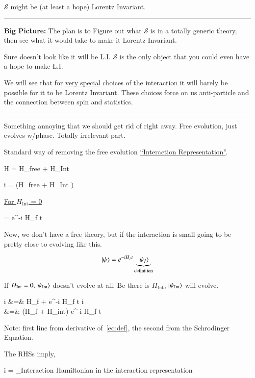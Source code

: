 {$\mathcal{S}$ might be (at least a hope) Lorentz Invariant.


\noindent\rule{\textwidth}{1pt}

\textbf{Big Picture:}
The plan is to Figure out what $\mathcal{S}$ is in a totally generic theory, then see what it would take to make it Lorentz Invariant. 

Sure doesn't look like it will be L.I. 
$\mathcal{S}$ is the only object that you could even have a hope to make L.I.

We will see that for \underline{very special} choices of the interaction it will barely be possible for it to be Lorentz Invariant. 
These choices force on us anti-particle and the connection between spin and statistics. 

\noindent\rule{\textwidth}{1pt}

Something annoying that we should get rid of right away. 
Free evolution, just evolves w/phase. Totally irrelevant part.


Standard way of removing the free evolution \underline{``Interaction Representation''}.

\be
H = H_\textrm{free} + H_\textrm{Int}
\ee


\be
i  = \left(H_\textrm{free} + H_\textrm{Int} \right) \ket{\psi} 
\ee

\underline{For $H_\textrm{Int}$ = 0}

\be
\ket{\psi} = e^{-i H_f t} 
\ee

Now, we don't have a free theory, but if the interaction is small going to be pretty close to evolving like this. 


\begin{equation}\label{eq:def}
\ket{\psi} = e^{-i H_f t} \underbrace{\ket{\psi_{I}}}_{\textrm{definition}}
\end{equation}

If $H_\textrm{Int} = 0, \ket{\psi_\textrm{Int}}$ doesn't evolve at all.
Bc there is $H_\textrm{Int}$, $\ket{\psi_\textrm{Int}}$ will evolve. 

\bea
i  \ket{\psi} &=& H_\textrm{f} \ket{\psi} + e^{-i H_f t} i   \\
&=& (H_f + H_\textrm{int}) e^{-i H_f t} 
\eea

Note: first line from derivative of~\ref{eq:def}, the second from the Schrodinger Equation.

The RHSs imply, 

\be
i   =  _{\textrm{Interaction Hamiltonian in the interaction representation}}   
\ee


}
